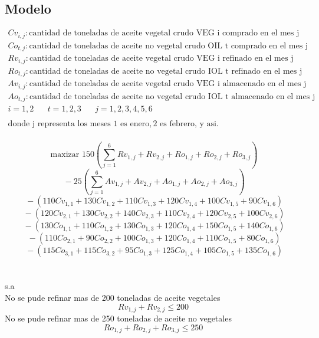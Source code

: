 \subsection{Modelo}
$\begin{array}{l}
Cv_{i,j}: \mbox{cantidad de toneladas de aceite vegetal crudo VEG i comprado en el mes j}\\
Co_{t,j}: \mbox{cantidad de toneladas de aceite no vegetal crudo OIL t comprado en el mes j}\\
Rv_{i,j}: \mbox{cantidad de toneladas de aceite vegetal crudo VEG i refinado en el mes j}\\
Ro_{t,j}: \mbox{cantidad de toneladas de aceite no vegetal crudo IOL t refinado en el mes j}\\
Av_{i,j}: \mbox{cantidad de toneladas de aceite vegetal crudo VEG i almacenado en el mes j}\\
Ao_{t,j}: \mbox{cantidad de toneladas de aceite no vegetal crudo IOL t almacenado en el mes j}\\
i=1,2  \;\;\;\;\;\; t=1,2,3 \;\;\;\;\;\; j=1,2,3,4,5,6\\ \\
\mbox{donde j representa los meses }1 \mbox{ es enero}, 2 \mbox{ es febrero, y asi.}
\end{array} $
\\ \\ 
$$\ \mbox{maxizar   } 150\left( \sum_{j=1}^{6}Rv_{1,j}+Rv_{2,j}+Ro_{1,j}+Ro_{2,j}+Ro_{3,j}\right) $$
$$\ - 25\left( \sum_{j=1}^{6}Av_{1,j}+Av_{2,j}+Ao_{1,j}+Ao_{2,j}+Ao_{3,j}\right) $$
$$\ - \left( 110Cv_{1,1}+130Cv_{1,2}+110Cv_{1,3}+120Cv_{1,4}+100Cv_{1,5}+90Cv_{1,6}\right) $$
$$\ - \left( 120Cv_{2,1}+130Cv_{2,2}+140Cv_{2,3}+110Cv_{2,4}+120Cv_{2,5}+100Cv_{2,6}\right) $$
$$\ - \left( 130Co_{1,1}+110Co_{1,2}+130Co_{1,3}+120Co_{1,4}+150Co_{1,5}+140Co_{1,6}\right) $$
$$\ - \left( 110Co_{2,1}+90Co_{2,2}+100Co_{1,3}+120Co_{1,4}+110Co_{1,5}+80Co_{1,6}\right) $$
$$\ - \left( 115Co_{3,1}+115Co_{3,2}+95Co_{1,3}+125Co_{1,4}+105Co_{1,5}+135Co_{1,6}\right) $$
\\ \\ 
s.a\\
No se pude refinar mas de 200 toneladas de aceite vegetales
\begin{equation}
Rv_{1,j} + Rv_{2,j} \leq 200 
\end{equation}
No se pude refinar mas de 250 toneladas de aceite no vegetales
\begin{equation}
Ro_{1,j} + Ro_{2,j} + Ro_{3,j} \leq 250 
\end{equation}
